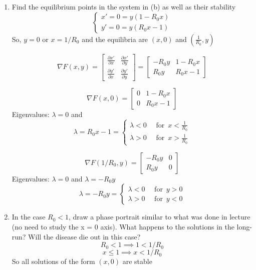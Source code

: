 \documentclass[12pt]{article}
\begin{document}
\begin{enumerate}
    \item Find the equilibrium points in the system in (b) as well as their
    stability
    \[\begin{cases}
        x' = 0 = y(1 - R_0 x)\\
        y' = 0 = y(R_0 x - 1)
    \end{cases}\]
    So, 
    $y= 0$ or $x = 1/R_0$ 
    and the equilibria are 
    $(x, 0)$ and $(\frac{1}{R_0}, y)$

    \[\nabla F(x, y) = \begin{bmatrix}
        \frac{\partial x'}{\partial x} & \frac{\partial x'}{\partial y}\\
        \frac{\partial y'}{\partial x} & \frac{\partial y'}{\partial y}
    \end{bmatrix} = \begin{bmatrix}
        -R_0 y & 1 - R_0 x\\
        R_0 y & R_0x - 1
    \end{bmatrix}\]

    \[\nabla F(x, 0) = \begin{bmatrix}
        0 & 1 - R_0 x\\
        0 & R_0 x - 1
    \end{bmatrix}\]
    Eigenvalues: $\lambda = 0$ and
    \[\lambda = R_0 x - 1 = \begin{cases}
       \lambda < 0 \quad \text{ for }\, x < \frac{1}{R_0}\\
        \lambda > 0 \quad \text{ for }\, x > \frac{1}{R_0}
    \end{cases}\]

    \[\nabla F(1/R_0, y) = \begin{bmatrix}
        -R_0 y & 0\\
        R_0 y & 0
    \end{bmatrix}\]
    Eigenvalues: $\lambda = 0$ and $\lambda = -R_0 y$ 
    \[\lambda = -R_0 y = \begin{cases}
        \lambda < 0 \quad \text{ for }\, y > 0\\
        \lambda > 0 \quad \text{ for }\, y < 0
    \end{cases}\]

    \item In the case $R_0 < 1$, draw a phase portrait similar to what was done in lecture (no need to study the x = 0 axis). What happens to the solutions in the long-run? Will the disease die out in this case?
    \[R_0 < 1 \implies 1 < 1/R_0\]
    \[x \leq 1 \implies x < 1/R_0 \]
    So all solutions of the form $(x, 0)$ are stable


\end{enumerate}
\end{document}
